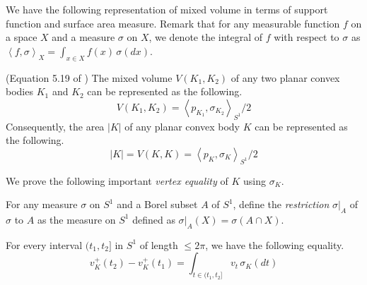 We have the following representation of mixed volume in terms of support function and surface area measure. Remark that for any measurable function \(f\) on a space \(X\) and a measure \(\sigma\) on \(X\), we denote the integral of \(f\) with respect to \(\sigma\) as \(\left< f, \sigma \right>_{X} = \int_{x \in X} f(x)\,\sigma(dx)\).

\begin{theorem}

(Equation 5.19 of \cite{schneider_2013}) The mixed volume \(V(K_1, K_2)\) of any two planar convex bodies \(K_1\) and \(K_2\) can be represented as the following.
\[
V(K_1, K_2) = \left< p_{K_1}, \sigma_{K_2} \right>_{S^1} / 2
\]
Consequently, the area \(|K|\) of any planar convex body \(K\) can be represented as the following.
\[
|K| = V(K, K) = \left< p_K, \sigma_K \right>_{S^1} / 2
\]

\label{thm:surface-area-measure-area}
\end{theorem}

We prove the following important \emph{vertex equality} of \(K\) using \(\sigma_K\).

\begin{definition}

For any measure \(\sigma\) on \(S^1\) and a Borel subset \(A\) of \(S^1\), define the \emph{restriction} \(\sigma|_A\) of \(\sigma\) to \(A\) as the measure on \(S^1\) defined as \(\sigma|_A(X) = \sigma(A \cap X)\).

\label{def:measure-restriction}
\end{definition}

\begin{theorem}

For every interval \((t_1, t_2]\) in \(S^1\) of length \(\leq 2\pi\), we have the following equality.
\[
v_K^+(t_2) - v_K^+(t_1) = \int_{t \in (t_1, t_2]} v_t \, \sigma_K(dt)
\]

\label{thm:boundary-measure}
\end{theorem}

